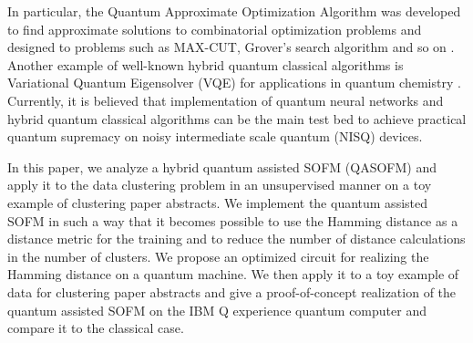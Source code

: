 \documentclass[pra,showkeys,twocolumn,showpacs]{revtex4-1}
\begin{document}
In particular, the Quantum Approximate Optimization Algorithm was developed to find approximate solutions to combinatorial optimization problems \cite{farhi2014,farhi2016} 
and designed to problems such as MAX-CUT, Grover’s search algorithm and so on \cite{arute2020,akshay2020,wang2018,jiang2017,huang2019,wecker2016,pagano2019}. 
Another example of well-known hybrid quantum classical algorithms is Variational Quantum Eigensolver (VQE) for applications in quantum chemistry 
\cite{kandala2017,aspuru-guzik2005,lanyon2010,peruzzo2014}.
Currently, it is believed that implementation of quantum neural networks and hybrid quantum classical algorithms can be the main test bed to achieve practical quantum supremacy on noisy intermediate scale quantum (NISQ) devices.

In this paper, we analyze  a hybrid quantum assisted SOFM (QASOFM) 
and apply it to the data clustering problem in an unsupervised manner on a toy example of clustering paper abstracts.   
We implement the quantum assisted SOFM in such a way 
that it becomes possible to use the Hamming distance as a distance metric for the training 
and to reduce the number of distance calculations in the number of clusters. 
We propose an optimized circuit for realizing the Hamming distance on a quantum machine. 
We then apply it to a toy example of data for clustering paper abstracts 
and give a proof-of-concept realization of the quantum assisted SOFM on the IBM Q experience quantum computer \cite{ibmq} 
and compare it to the classical case.
\end{document}

